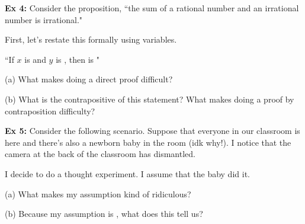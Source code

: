 \documentclass[fleqn]{article}
\theoremstyle{definition}
\begin{document}
\vspace{.25cm}
\textbf{Ex 4:} Consider the proposition, ``the sum of a rational number and an irrational number is irrational." 

\vspace{.25cm}
First, let's restate this formally using variables. 

\vspace{.25cm}
    \hspace{1cm} ``If $x$ is \underline{\hspace{3cm}} and $y$ is \underline{\hspace{3cm}}, then \underline{\hspace{1.5cm}} is \underline{\hspace{3cm}}"

\vspace{.5cm}
(a) What makes doing a direct proof difficult? 

\vspace{2cm}
(b) What is the contrapositive of this statement? What makes doing a proof by contraposition difficulty?

\vspace{4cm}
\textbf{Ex 5:} Consider the following scenario. Suppose that everyone in our classroom is here and there's also a newborn baby in the room (idk why!). I notice that the camera at the back of the classroom has dismantled. 

\vspace{.25cm}
I decide to do a thought experiment. I assume that the baby did it. 

\vspace{.25cm}
(a) What makes my assumption kind of ridiculous? 

\vspace{1.5cm}
(b) Because my assumption is \underline{\hspace{3cm}}, what does this tell us? 

\vspace{1.5cm}


\newpage 
\end{document}
